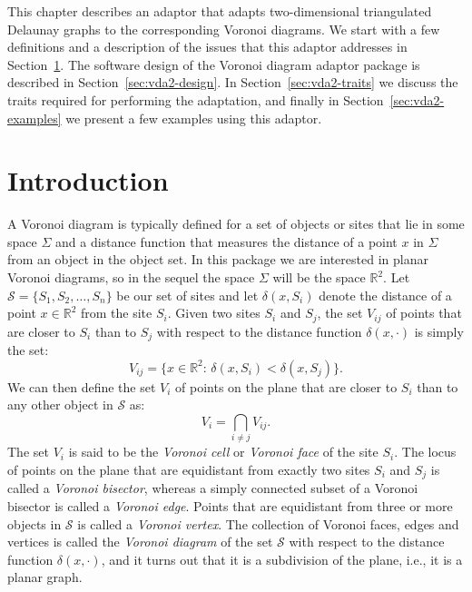 
This chapter describes an adaptor that adapts two-dimensional
triangulated Delaunay graphs to the corresponding Voronoi diagrams.
We start with a few
definitions and a description of the issues that this adaptor
addresses in Section~\ref{sec:vda2-intro}. The software design
of the Voronoi diagram adaptor package is described in
Section~\ref{sec:vda2-design}. In Section~\ref{sec:vda2-traits} we
discuss the traits required for performing the adaptation, and finally
in Section~\ref{sec:vda2-examples} we present a few examples using
this adaptor.

\section{Introduction}
\label{sec:vda2-intro}

A Voronoi diagram is typically defined for a set of objects or sites
that lie in some space $\Sigma$ and a distance function that measures
the distance of a point $x$ in $\Sigma$ from an object in the object
set. In this package we are interested in planar Voronoi diagrams, so
in the sequel the space $\Sigma$ will be the space $\mathbb{R}^2$. Let
$\mathcal{S}=\{S_1,S_2,\ldots,S_n\}$ be our set of sites and let
$\delta(x,S_i)$ denote the distance of a point $x\in\mathbb{R}^2$ from
the site $S_i$. Given two sites $S_i$ and $S_j$, the set $V_{ij}$
of points that are closer to $S_i$ than to $S_j$ with respect to the
distance function $\delta(x,\cdot)$ is simply the set:
\[   V_{ij} = \{x\in\mathbb{R}^2:\, \delta(x,S_i)<\delta(x,S_j)\}. \]
We can then define the set $V_i$ of points on the plane that are closer to
$S_i$ than to any other object in $\mathcal{S}$ as:
\[  V_i = \bigcap_{i\ne j} V_{ij}. \]
The set $V_i$ is said to be the \emph{Voronoi cell} or \emph{Voronoi face} 
of the site $S_i$. The locus of points on the plane that are
equidistant from exactly two sites $S_i$ and $S_j$ is called a
\emph{Voronoi bisector}, whereas a simply connected subset of a
Voronoi bisector is called a \emph{Voronoi edge}. Points that are
equidistant from three or more objects in $\mathcal{S}$ is called a
\emph{Voronoi vertex}.
The collection of Voronoi faces, edges and vertices is called the
\emph{Voronoi diagram} of the set $\mathcal{S}$ with respect to the
distance function $\delta(x,\cdot)$, and it turns out that it is a
subdivision of the plane, i.e., it is a planar graph.

